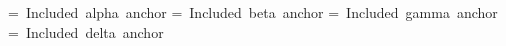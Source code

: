 \setbox\AlphaBox=\hbox{\kern55bp Included alpha anchor}
\setbox\BetaBox=\hbox{\kern61bp Included beta anchor}
\setbox\GammaBox=\hbox{\kern66bp Included gamma anchor}
\setbox\DeltaBox=\hbox{\kern73bp Included delta anchor}
